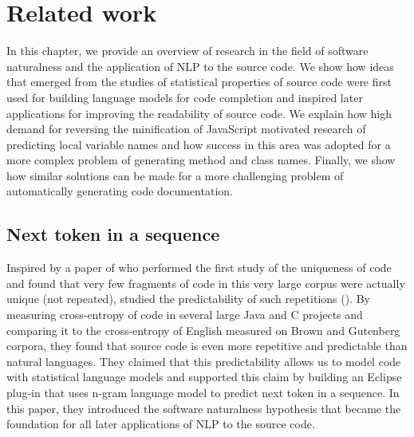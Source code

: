 \chapter{Related work}
\label{chap:RelatedWork}
\mtoc

In this chapter, we provide an overview of research in the field of software naturalness and the application of NLP to the source code. We show how ideas that emerged from the studies of statistical properties of source code were first used for building language models for code completion and inspired later applications for improving the readability of source code. We explain how high demand for reversing the minification of JavaScript motivated research of predicting local variable names and how success in this area was adopted for a more complex problem of generating method and class names. Finally, we show how similar solutions can be made for a more challenging problem of automatically generating code documentation.


\section{Next token in a sequence}

Inspired by a paper of \cite{Gabe10} who performed the first study of the uniqueness of code and found that very few fragments of code in this very large corpus were actually unique (not repeated), \cite{Hind12} studied the predictability of such repetitions (\cite{Deva15}). By measuring cross-entropy of code in several large Java and C projects and comparing it to the cross-entropy of English measured on Brown and Gutenberg corpora, they found that source code is even more repetitive and predictable than natural languages. They claimed that this predictability allows us to model code with statistical language models and supported this claim by building an Eclipse plug-in that uses n-gram language model to predict next token in a sequence. In this paper, they introduced the software naturalness hypothesis that became the foundation for all later applications of NLP to the source code.

